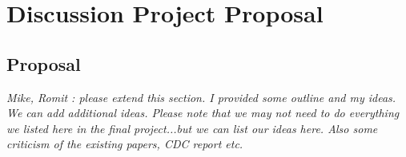 \documentclass[12pt, journal,onecolumn]{IEEEtran}
\begin{document}

\section{Discussion Project Proposal}
\label{sec:ProjectProposal}

\subsection{Proposal}

\bigskip
{\em{Mike, Romit : please extend this section. I provided some outline and my ideas. We can add additional ideas. Please note that we may not need to do everything we listed here in the final project...but we can list our ideas here. Also some criticism of the existing papers, CDC report etc.}}
\end{document}
